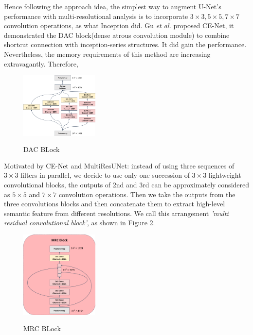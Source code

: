 \documentclass{ieeeaccess}
\begin{document}
  Hence following the approach idea, the simplest way to augment U-Net's performance with multi-resolutional analysis is to incorporate \(3\times 3, 5\times 5, 7\times 7\) convolution operations, as what Inception\cite{SzegedyVISW16} did.
  Gu \emph{et al.} proposed CE-Net\cite{cenet}, it demonstrated the DAC block(dense atrous convolution module) to combine shortcut connection with inception-series structures.
  It did gain the performance. Nevertheless, the memory requirements of this method are increasing extravagantly. Therefore, 
  
  \begin{figure}[htbp]
    \small
    \centering
    \includegraphics[width=0.35\textwidth]{figure/DAC_block.pdf}
    \label{fig:dac_block}
    \caption{DAC BLock}
  \end{figure}
  
  
  Motivated by CE-Net\cite{cenet} and MultiResUNet\cite{IbtehazR20}: instead of using three sequences of \(3\times 3\) filters in parallel, 
  we decide to use only one succession of \(3 \times 3\) lightweight convolutional blocks, the outputs of 2nd and 3rd can be approximately considered as \(5\times 5\) and \(7 \times 7\) convolution operations. Then we take the outputs from the three convolutions blocks and then concatenate
  them to extract high-level semantic feature from different resolutions. We call this arrangement  \emph{'multi residual convolutional block'}, as shown in Figure \ref{fig:mrc_block}.
  
  \begin{figure}[htbp]
    \small
    \centering
    \includegraphics[width=0.35\textwidth]{figure/MRC_block.pdf}
    \label{fig:mrc_block}
    \caption{MRC BLock}
  \end{figure}
  
\end{document}
